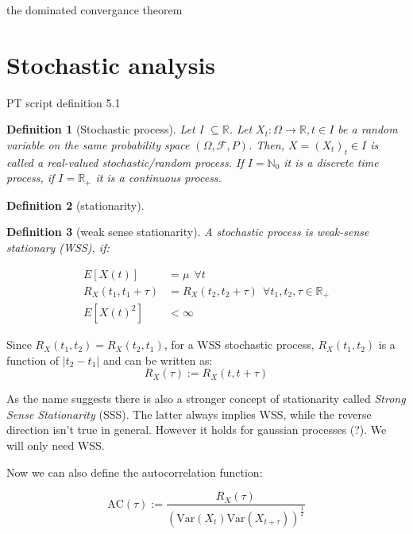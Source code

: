 \documentclass[%
thesis=student,%
coverpage=false,%
titlepage=false,%
headmarks=true, %
german,%
font=libertine, %
math=newpxtx, %
BCOR=5mm,%
coverBCOR=11mm%
]{tumbook}
\newtheorem{definition}{Definition}[section]
\begin{document}
the dominated convergance theorem

\section{Stochastic analysis}

PT script definition 5.1
\begin{definition}[Stochastic process]
Let I $\subseteq \mathbb{R}$. Let $X_{t}:\Omega \rightarrow \mathbb{R}, t \in I$ be a random variable on the same probability space $(\Omega,\mathcal{F},P)$. Then, $X = (X_{t})_{t} \in I$ is called a real-valued stochastic/random process. If $I = \mathbb{N}_{0}$ it is a discrete time process, if  $I = \mathbb{R}_{+}$ it is a continuous process.
\end{definition}

\begin{definition}[stationarity]
    
\end{definition}


\begin{definition}[weak sense stationarity]
A stochastic process is weak-sense stationary (WSS), if:

\begin{subequations}
    \begin{align}
        E[X(t)] &= \mu \ \ \forall t \\
        R_{X}(t_{1},t_{1} + \tau) &= R_{X}(t_{2},t_{2} + \tau) \ \ \forall t_{1},t_{2},\tau \in \mathbb{R}_{+} \\
        E[X(t)^2]&<\infty
    \end{align}
\end{subequations}   
\end{definition}

Since $R_{X}(t_{1},t_{2}) = R_{X}(t_{2},t_{1})$, for a WSS stochastic process, $R_{X}(t_{1},t_{2})$ is a function of $\lvert t_{2} - t_{1} \rvert$ and can be written as:
\[
R_{X}(\tau) := R_{X}(t,t + \tau)
\]

As the name suggests there is also a stronger concept of stationarity called \textit{Strong Sense Stationarity} (SSS). The latter always implies WSS, while the reverse direction isn't true in general. However it holds for gaussian processes (?). We will only need WSS.

Now we can also define the autocorrelation function:


\[
\text{AC}(\tau) := \frac{R_{X}(\tau)}{(\text{Var}(X_{t})\text{Var}(X_{t+\tau}))^{\frac{1}{2}}}
\]
\end{document}
